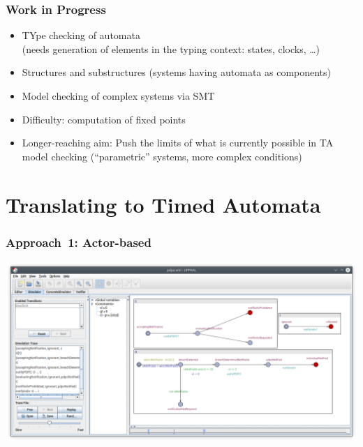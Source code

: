 \documentclass{beamer}
\begin{document}
\begin{frame}[fragile]\frametitle{Work in Progress}

  \begin{itemize}
  \item TYpe checking of automata\\
    (needs generation of elements in the typing context: states, clocks,
    \dots)
  \item Structures and substructures (systems having automata as components)
  \item Model checking of complex systems via SMT 
  \item Difficulty: computation of fixed points
  \item Longer-reaching aim: Push the limits of what is currently possible in
    TA model checking (``parametric'' systems, more complex conditions)
  \end{itemize}

\end{frame}

\section{Translating to Timed Automata}


\begin{frame}[fragile]\frametitle{Approach~1: Actor-based}

  \begin{center}
    \includegraphics[scale=0.3]{Figures/actor_based_translation.png}
  \end{center}

\end{frame}
\end{document}
